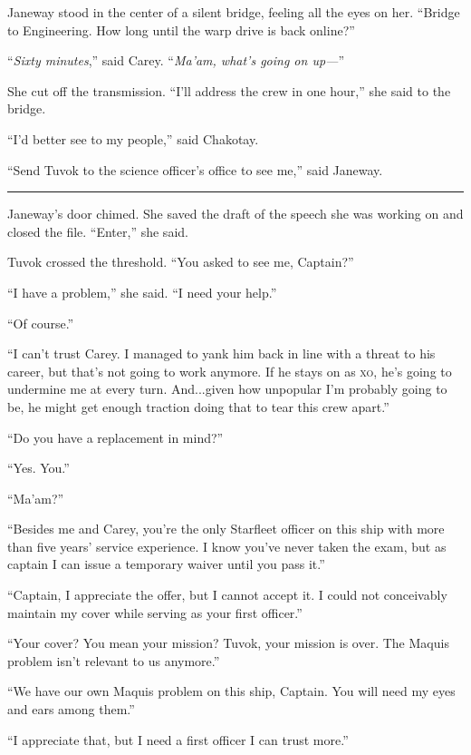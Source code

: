 \documentclass[twoside,letterpaper,12pt]{memoir}
\begin{document}
Janeway stood in the center of a silent bridge, feeling all the eyes on her. ``Bridge to Engineering. How long until the warp drive is back online?” 

``\textit{Sixty minutes},” said Carey. ``\textit{Ma’am, what’s going on up---}” 

She cut off the transmission. ``I’ll address the crew in one hour,” she said to the bridge. 

``I’d better see to my people,” said Chakotay. 

``Send Tuvok to the science officer’s office to see me,” said Janeway. 

\begin{center}\rule{3cm}{0.4 pt}\end{center} 

Janeway’s door chimed. She saved the draft of the speech she was working on and closed the file. ``Enter,” she said. 

Tuvok crossed the threshold. ``You asked to see me, Captain?” 

``I have a problem,” she said. ``I need your help.” 

``Of course.” 

``I can’t trust Carey. I managed to yank him back in line with a threat to his career, but that’s not going to work anymore. If he stays on as \textsc{xo}, he’s going to undermine me at every turn. And...given how unpopular I’m probably going to be, he might get enough traction doing that to tear this crew apart.” 

``Do you have a replacement in mind?” 

``Yes. You.” 

``Ma’am?” 

``Besides me and Carey, you’re the only Starfleet officer on this ship with more than five years’ service experience. I know you’ve never taken the exam, but as captain I can issue a temporary waiver until you pass it.” 

``Captain, I appreciate the offer, but I cannot accept it. I could not conceivably maintain my cover while serving as your first officer.” 

``Your cover? You mean your mission? Tuvok, your mission is over. The Maquis problem isn’t relevant to us anymore.” 

``We have our own Maquis problem on this ship, Captain. You will need my eyes and ears among them.” 

``I appreciate that, but I need a first officer I can trust more.” 
\end{document}
